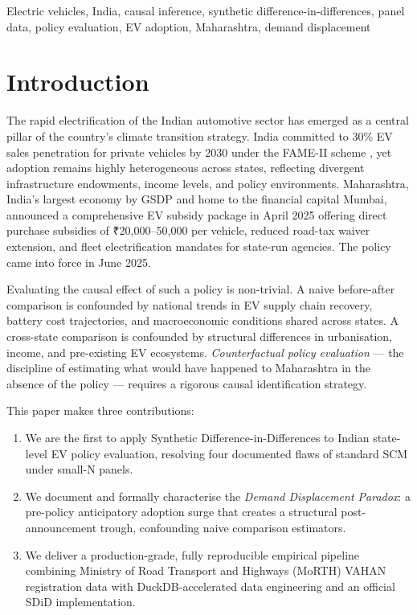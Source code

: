 \documentclass[journal]{IEEEtran}
\begin{document}
\begin{IEEEkeywords}
Electric vehicles, India, causal inference, synthetic difference-in-differences,
panel data, policy evaluation, EV adoption, Maharashtra, demand displacement
\end{IEEEkeywords}

\section{Introduction}
\label{sec:intro}

The rapid electrification of the Indian automotive sector has emerged as a
central pillar of the country's climate transition strategy. India committed
to 30\% EV sales penetration for private vehicles by 2030 under the FAME-II
scheme \citep{FAME2}, yet adoption remains highly heterogeneous across
states, reflecting divergent infrastructure endowments, income levels, and
policy environments. Maharashtra, India's largest economy by GSDP and home
to the financial capital Mumbai, announced a comprehensive EV subsidy
package in April 2025 offering direct purchase subsidies of
\textrm{₹}20,000–50,000 per vehicle, reduced road-tax waiver extension, and
fleet electrification mandates for state-run agencies. The policy came into
force in June 2025.

Evaluating the causal effect of such a policy is non-trivial. A naive
before-after comparison is confounded by national trends in EV supply chain
recovery, battery cost trajectories, and macroeconomic conditions shared
across states. A cross-state comparison is confounded by structural
differences in urbanisation, income, and pre-existing EV ecosystems. 
\emph{Counterfactual policy evaluation} — the discipline of estimating what
would have happened to Maharashtra in the absence of the policy — requires a
rigorous causal identification strategy.

This paper makes three contributions:
\begin{enumerate}
  \item We are the first to apply Synthetic Difference-in-Differences 
        \citep{Arkhangelsky2021} to Indian state-level EV policy evaluation, 
        resolving four documented flaws of standard SCM under small-N panels.
  \item We document and formally characterise the \emph{Demand Displacement
        Paradox}: a pre-policy anticipatory adoption surge that creates a 
        structural post-announcement trough, confounding naive comparison 
        estimators.
  \item We deliver a production-grade, fully reproducible empirical pipeline 
        combining Ministry of Road Transport and Highways (MoRTH) VAHAN 
        registration data with DuckDB-accelerated data engineering and an 
        official SDiD implementation.
\end{enumerate}
\end{document}
